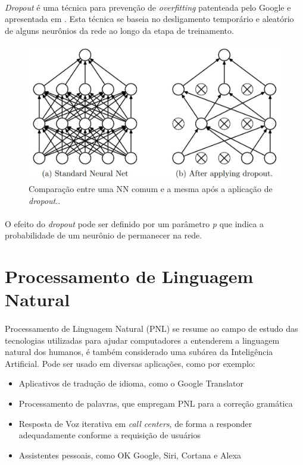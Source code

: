 \documentclass[grad,numbers]{coppe}
\begin{document}
  		\paragraph{}\textit{Dropout} é uma técnica para prevenção de \textit{overfitting} patenteada pelo Google e apresentada em \cite{dropout-ex}. Esta técnica se baseia no desligamento temporário e aleatório de alguns neurônios da rede ao longo da etapa de treinamento.
			\begin{figure}[h]
  			\centering
  			\includegraphics[width=12cm]{dropout-ex.jpg}
  			\caption{Comparação entre uma NN comum e a mesma após a aplicação de \textit{dropout}.\cite{dropout-ex}.}
  			\label{fig:dropout-ex-fig}
  		\end{figure}
  		\paragraph{}O efeito do \textit{dropout} pode ser definido por um parâmetro \textit{p} que indica a probabilidade de um neurônio  de permanecer na rede.
  \section{Processamento de Linguagem Natural}
  	\paragraph{}Processamento de Linguagem Natural (PNL) se resume ao campo de estudo das tecnologias utilizadas para ajudar computadores a entenderem a linguagem natural dos humanos, é também considerado uma subárea da Inteligência Artificial. Pode ser usado em diversas aplicações\cite{simple-nlp}, como por exemplo:
  	\begin{itemize}
  		\item Aplicativos de tradução de idioma, como o Google Translator
  		\item Processamento de palavras, que empregam PNL para a correção gramática
  		\item Resposta de Voz iterativa em \textit{call centers}, de forma a responder adequadamente conforme a requisição de usuários
  		\item Assistentes pessoais, como OK Google, Siri, Cortana e Alexa
  	\end{itemize}
\end{document}
